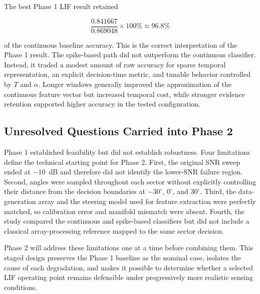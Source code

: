 The best Phase 1 LIF result retained

\[
    \frac{0.841667}{0.869048}\times 100\%
    \approx 96.8\%
\]

of the continuous baseline accuracy. This is the correct interpretation of the Phase 1 result. The spike-based path did not outperform the continuous classifier. Instead, it traded a modest amount of raw accuracy for sparse temporal representation, an explicit decision-time metric, and tunable behavior controlled by $T$ and $\alpha$. Longer windows generally improved the approximation of the continuous feature vector but increased temporal cost, while stronger evidence retention supported higher accuracy in the tested configuration.

\subsection{Unresolved Questions Carried into Phase 2}

Phase 1 established feasibility but did not establish robustness. Four limitations define the technical starting point for Phase 2. First, the original SNR sweep ended at $-10$~dB and therefore did not identify the lower-SNR failure region. Second, angles were sampled throughout each sector without explicitly controlling their distance from the decision boundaries at $-30^{\circ}$, $0^{\circ}$, and $30^{\circ}$. Third, the data-generation array and the steering model used for feature extraction were perfectly matched, so calibration error and manifold mismatch were absent. Fourth, the study compared the continuous and spike-based classifiers but did not include a classical array-processing reference mapped to the same sector decision.

Phase 2 will address these limitations one at a time before combining them. This staged design preserves the Phase 1 baseline as the nominal case, isolates the cause of each degradation, and makes it possible to determine whether a selected LIF operating point remains defensible under progressively more realistic sensing conditions.
